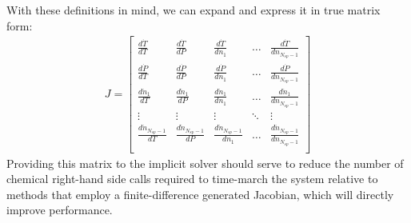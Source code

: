 With these definitions in mind, we can expand  and express
it in true matrix form:
\begin{align}
J = \begin{bmatrix} \frac{d\dot{T}}{dT} & \frac{d\dot{T}}{dP} & \frac{d\dot{T}}{dn_{1}} & \hdots & \frac{d\dot{T}}{dn_{N_{sp}-1}} \\
                    \frac{d\dot{P}}{dT} & \frac{d\dot{P}}{dP} & \frac{d\dot{P}}{dn_{1}} & \hdots & \frac{d\dot{P}}{dn_{N_{sp}-1}} \\
		    \frac{d\dot{n}_{1}}{dT} & \frac{d\dot{n}_{1}}{dP} & \frac{d\dot{n}_{1}}{dn_{1}} & \hdots & \frac{d\dot{n}_{1}}{dn_{N_{sp}-1}} \\
		    \vdots & \vdots & \vdots & \ddots & \vdots \\
		    \frac{d\dot{n}_{N_{sp}-1}}{dT} & \frac{d\dot{n}_{N_{sp}-1}}{dP} & \frac{d\dot{n}_{N_{sp}-1}}{dn_{1}} & \hdots & \frac{d\dot{n}_{N_{sp}-1}}{dn_{N_{sp}-1}} \\
    \end{bmatrix}
\end{align}
Providing this matrix to the implicit solver should serve to reduce the
number of chemical right-hand side calls required to time-march the
system relative to methods that employ a finite-difference generated
Jacobian, which will directly improve performance.

